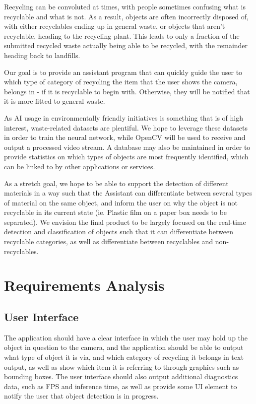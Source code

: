 \documentclass[conference]{IEEEtran}
\begin{document}
Recycling can be convoluted at times, with people sometimes confusing what is recyclable and what is not. As a result, objects are often incorrectly disposed of, with either recyclables ending up in general waste, or objects that aren't recyclable, heading to the recycling plant. This leads to only a fraction of the submitted recycled waste actually being able to be recycled, with the remainder heading back to landfills. 

Our goal is to provide an assistant program that can quickly guide the user to which type of category of recycling the item that the user shows the camera, belongs in - if it is recyclable to begin with. Otherwise, they will be notified that it is more fitted to general waste.

As AI usage in environmentally friendly initiatives is something that is of high interest, waste-related datasets are plentiful. We hope to leverage these datasets in order to train the neural network, while OpenCV will be used to receive and output a processed video stream. A database may also be maintained in order to provide statistics on which types of objects are most frequently identified, which can be linked to by other applications or services. 

As a stretch goal, we hope to be able to support the detection of different materials in a way such that the Assistant can differentiate between several types of material on the same object, and inform the user on why the object is not recyclable in its current state (ie. Plastic film on a paper box needs to be separated).
We envision the final product to be largely focused on the real-time detection and classification of objects such that it can differentiate between recyclable categories, as well as differentiate between recyclables and non-recyclables.


\section{Requirements Analysis}

\subsection{User Interface}

The application should have a clear interface in which the user may hold up the object in question to the camera, and the application should be able to output what type of object it is via, and which category of recycling it belongs in text output, as well as show which item it is referring to through graphics such as bounding boxes.
\newline
The user interface should also output additional diagnostics data, such as FPS and inference time, as well as provide some UI element to notify the user that object detection is in progress.
\end{document}
